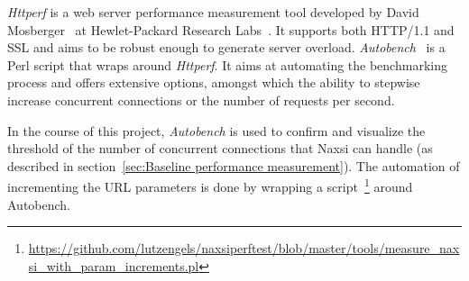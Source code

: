 \emph{Httperf} is a web server performance measurement tool developed by David Mosberger~\cite{mosberger1998httperf} at Hewlet-Packard Research Labs~\cite{httperf}. It supports both HTTP/1.1 and SSL and aims to be robust enough to generate server overload. \emph{Autobench}~\cite{autobench2013} is a Perl script that wraps around \emph{Httperf}. It aims at automating the benchmarking process and offers extensive options, amongst which the ability to stepwise increase concurrent connections or the number of requests per second. 

In the course of this project, \emph{Autobench} is used to confirm and visualize the threshold of the number of concurrent connections that Naxsi can handle (as described in section~\ref{sec:Baseline performance measurement}). The automation of incrementing the URL parameters is done by wrapping a script~\footnote{\url{https://github.com/lutzengels/naxsiperftest/blob/master/tools/measure_naxsi_with_param_increments.pl}} around Autobench.
